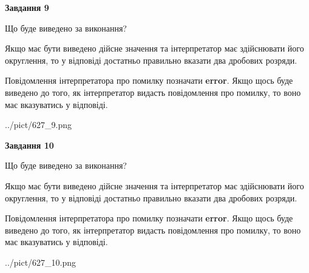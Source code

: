 \documentclass[12pt, ukrainian]{article}
\begin{document}
{\begin {Large}
{\begin {center}\textbf{Завдання 9}\end {center}}\par
Що буде виведено за виконання? \par

Якщо має бути виведено дійсне значення та інтерпретатор має здійснювати його округлення, 
то у відповіді достатньо правильно вказати два дробових розряди.

Повідомлення інтерпретатора про помилку позначати \textbf{error}.
Якщо щось буде виведено до того, як інтерпретатор видасть повідомлення про помилку, 
то воно має вказуватись у відповіді. \par

\begin{center}
	{../pict/627_9.png}
\end{center}
\newpage

{\begin {center}\textbf{Завдання 10}\end {center}}\par
Що буде виведено за виконання? \par

Якщо має бути виведено дійсне значення та інтерпретатор має здійснювати його округлення, 
то у відповіді достатньо правильно вказати два дробових розряди.

Повідомлення інтерпретатора про помилку позначати \textbf{error}.
Якщо щось буде виведено до того, як інтерпретатор видасть повідомлення про помилку, 
то воно має вказуватись у відповіді. \par

\begin{center}
	{../pict/627_10.png}
\end{center}
\newpage

\end {Large}}
\end{document}
